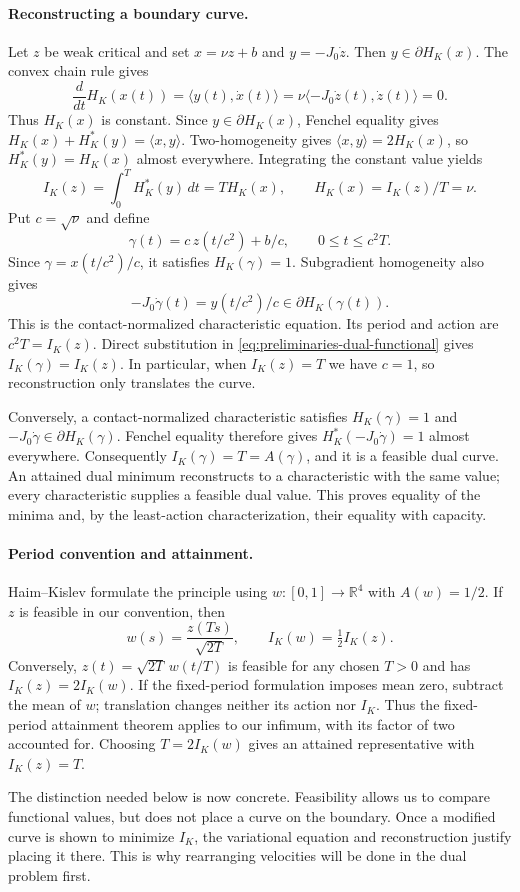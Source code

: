 \paragraph{Reconstructing a boundary curve.}
Let $z$ be weak critical and set $x=\nu z+b$ and $y=-J_0\dot z$.
Then $y\in\partial H_K(x)$. The convex chain rule gives
\[
 \frac{d}{dt}H_K(x(t))=\langle y(t),\dot x(t)\rangle
 =\nu\langle-J_0\dot z(t),\dot z(t)\rangle=0.
\]
Thus $H_K(x)$ is constant. Since $y\in\partial H_K(x)$, Fenchel equality gives
$H_K(x)+H_K^*(y)=\langle x,y\rangle$. Two-homogeneity gives
$\langle x,y\rangle=2H_K(x)$, so $H_K^*(y)=H_K(x)$ almost everywhere.
Integrating the constant value yields
\[
 I_K(z)=\int_0^T H_K^*(y)\,dt=T H_K(x),
 \qquad H_K(x)=I_K(z)/T=\nu.
\]
Put $c=\sqrt\nu$ and define
\[
 \gamma(t)=c\,z(t/c^2)+b/c,\qquad 0\leq t\leq c^2T.
\]
Since $\gamma=x(t/c^2)/c$, it satisfies $H_K(\gamma)=1$.
Subgradient homogeneity also gives
\[
 -J_0\dot\gamma(t)=y(t/c^2)/c\in\partial H_K(\gamma(t)).
\]
This is the contact-normalized characteristic equation. Its period and
action are $c^2T=I_K(z)$. Direct substitution in
\eqref{eq:preliminaries-dual-functional} gives $I_K(\gamma)=I_K(z)$.
In particular, when $I_K(z)=T$ we have $c=1$, so reconstruction only
translates the curve.

Conversely, a contact-normalized characteristic satisfies
$H_K(\gamma)=1$ and $-J_0\dot\gamma\in\partial H_K(\gamma)$.
Fenchel equality therefore gives $H_K^*(-J_0\dot\gamma)=1$ almost
everywhere. Consequently $I_K(\gamma)=T=A(\gamma)$, and it is a feasible
dual curve. An attained dual minimum reconstructs to a characteristic
with the same value; every characteristic supplies a feasible dual value.
This proves equality of the minima and, by the least-action
characterization, their equality with capacity.

\paragraph{Period convention and attainment.}
Haim--Kislev formulate the principle using $w:[0,1]\to\mathbb R^4$ with
$A(w)=1/2$. If $z$ is feasible in our convention, then
\[
 w(s)=\frac{z(Ts)}{\sqrt{2T}},\qquad I_K(w)=\tfrac12 I_K(z).
\]
Conversely, $z(t)=\sqrt{2T}\,w(t/T)$ is feasible for any chosen $T>0$
and has $I_K(z)=2I_K(w)$. If the fixed-period formulation imposes mean zero,
subtract the mean of $w$; translation changes neither its action nor $I_K$.
Thus the fixed-period attainment theorem applies
to our infimum, with its factor of two accounted for. Choosing
$T=2I_K(w)$ gives an attained representative with $I_K(z)=T$.

The distinction needed below is now concrete. Feasibility allows us to
compare functional values, but does not place a curve on the boundary.
Once a modified curve is shown to minimize $I_K$, the variational equation
and reconstruction justify placing it there. This is why rearranging
velocities will be done in the dual problem first.
